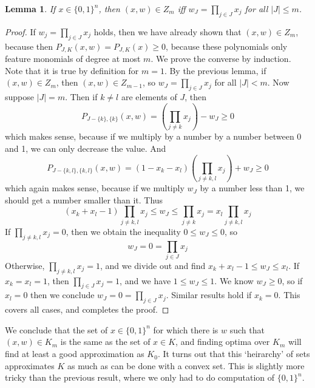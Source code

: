\documentclass{article}
\theoremstyle{plain}
\newtheorem{lemma}[theorem]{Lemma}
\theoremstyle{definition}
\begin{document}
\begin{lemma}
    If $x \in \{ 0, 1 \}^n$, then $(x,w) \in Z_m$ iff $w_J = \prod_{j \in J} x_j$ for all $|J| \leq m$.
\end{lemma}
\begin{proof}
    If $w_j = \prod_{j \in J} x_j$ holds, then we have already shown that $(x,w) \in Z_m$, because then $P_{J,K}(x,w) = P_{J,K}(x) \geq 0$, because these polynomials only feature monomials of degree at most $m$. We prove the converse by induction. Note that it is true by definition for $m = 1$. By the previous lemma, if $(x,w) \in Z_m$, then $(x,w) \in Z_{m-1}$, so $w_J = \prod_{j \in J} x_j$ for all $|J| < m$. Now suppose $|J| = m$. Then if $k \neq l$ are elements of $J$, then
    \[ P_{J - \{k \}, \{ k \}}(x,w) = \left( \prod_{j \neq k} x_j \right) - w_{J} \geq 0 \]
    which makes sense, because if we multiply by a number by a number between 0 and 1, we can only decrease the value. And
    \[ P_{J-\{k,l\}, \{k,l \}}(x,w) = (1 - x_k - x_l) \left( \prod_{j \neq k,l} x_j \right) + w_J \geq 0 \]
    which again makes sense, because if we multiply $w_J$ by a number less than 1, we should get a number smaller than it. Thus
    \[ (x_k + x_l - 1) \prod_{j \neq k,l} x_j \leq w_J \leq \prod_{j \neq k} x_j = x_l \prod_{j \neq k,l} x_j \]
    If $\prod_{j \neq k,l} x_j = 0$, then we obtain the inequality $0 \leq w_J \leq 0$, so
    \[ w_J = 0 = \prod_{j \in J} x_j \]
    Otherwise, $\prod_{j \neq k,l} x_j = 1$, and we divide out and find $x_k + x_l - 1 \leq w_J \leq x_l$. If $x_k = x_l = 1$, then $\prod_{j \in J} x_j = 1$, and we have $1 \leq w_J \leq 1$. We know $w_J \geq 0$, so if $x_l = 0$ then we conclude $w_J = 0 = \prod_{j \in J} x_j$. Similar results hold if $x_k = 0$. This covers all cases, and completes the proof.
\end{proof}

We conclude that the set of $x \in \{ 0, 1 \}^n$ for which there is $w$ such that $(x,w) \in K_m$ is the same as the set of $x \in K$, and finding optima over $K_m$ will find at least a good approximation as $K_0$. It turns out that this `heirarchy' of sets approximates $K$ as much as can be done with a convex set. This is slightly more tricky than the previous result, where we only had to do computation of $\{ 0, 1 \}^n$.
\end{document}

